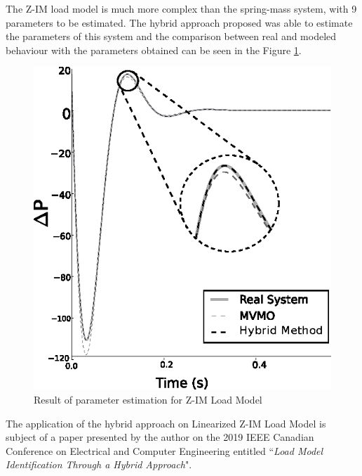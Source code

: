 \begin{apendicesenv}
The Z-IM load model is much more complex than the spring-mass system, with 9 parameters to be estimated. The hybrid approach proposed was able to estimate the parameters of this system and the comparison between real and modeled behaviour with the parameters obtained can be seen in the Figure \ref{fig: ZIM}.

\begin{figure}[h]
	\caption{Result of parameter estimation for Z-IM Load Model}
	\begin{center}
		\includegraphics[scale=1]{Images/ZIM.eps}
	\end{center}
	\label{fig: ZIM}
\end{figure}

The application of the hybrid approach on Linearized Z-IM Load Model is subject of a paper presented by the author on the 2019 IEEE Canadian Conference on Electrical and Computer Engineering entitled ``\textit{Load Model Identification Through a Hybrid Approach}".
\end{apendicesenv}